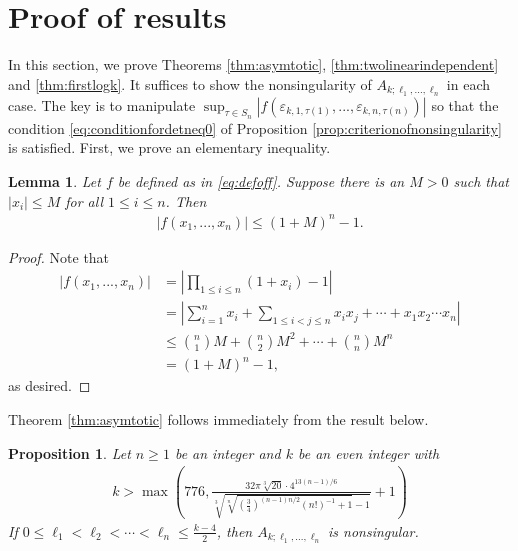 \documentclass[11pt,letterpaper,reqno]{amsart}
\numberwithin{figure}{section}
\numberwithin{table}{section}
\theoremstyle{definition}
\theoremstyle{plain}
\newtheorem{lemma}[theorem]{Lemma}
\newtheorem{proposition}[theorem]{Proposition}
\theoremstyle{definition}
\theoremstyle{definition}
\theoremstyle{remark}
\numberwithin{equation}{section}
\theoremstyle{remark}
\begin{document}
\section{Proof of results}\label{sect:proofs}
In this section, we prove Theorems \ref{thm:asymtotic}, \ref{thm:twolinearindependent} and \ref{thm:firstlogk}. It suffices to show the nonsingularity of $A_{k;\ell_1,...,\ell_n}$ in each case. The key is to manipulate $\sup_{\tau\in S_n}|f(\varepsilon_{k,1,\tau(1)},...,\varepsilon_{k,n,\tau(n)})|$ so that the condition \eqref{eq:conditionfordetneq0} of Proposition \ref{prop:criterionofnonsingularity} is satisfied. First, we prove an elementary inequality.
\begin{lemma}\label{lem:inequalityforf}
    Let $f$ be defined as in \eqref{eq:defoff}. Suppose there is an $M>0$  such that $|x_i|\leq M$ for all $1\leq i\leq n$. Then 
    \begin{align}
        |f(x_1,...,x_n)|\leq(1+M)^{n}-1.
    \end{align}
\end{lemma}
\begin{proof}
    Note that 
    \begin{align}
|f(x_1,...,x_n)|&=\left|\prod_{1\leq i\leq n}(1+x_i)-1\right|\\&=
\left|\sum_{i=1}^nx_{i}+\sum_{1\leq i<j\leq n}x_ix_j+\cdots+x_1x_2\cdots x_n\right|\\&\leq\binom{n}{1}M+\binom{n}{2}M^2+\cdots+\binom{n}{n}M^n\\&=(1+M)^n-1,\label{eq:boundoff}\end{align}
as desired.
\end{proof}
Theorem \ref{thm:asymtotic} follows immediately from the result below.
\begin{proposition}\label{prop:nonsingularityasymptotic}
Let $n\geq1$ be an integer and $k$ be an even integer with \begin{align}k>\max\left(776,\frac{32\pi\sqrt[3]{20}\cdot4^{13(n-1)/6}}{\sqrt[3]{\sqrt[n]{\left(\frac{3}{4}\right)^{(n-1)n/2}(n!)^{-1}+1}-1}}+1\right)\label{eq:lowerboundforgeneralcase}\end{align}
If $0\leq\ell_1<\ell_2<\cdots<\ell_n\leq\frac{k-4}{2}$, then $A_{k;\ell_1,...,\ell_n}$ is nonsingular.
\end{proposition}
\end{document}
